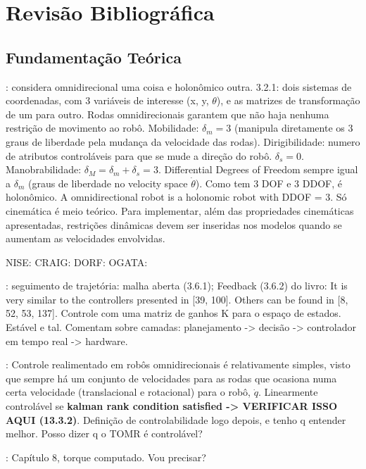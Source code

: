 \section{Revisão Bibliográfica}
\label{sec:revbib}

\subsection{Fundamentação Teórica}


\cite{siegwart2011introduction}: considera omnidirecional uma coisa e holonômico outra. 3.2.1: dois sistemas de coordenadas, com 3 variáveis de interesse (x, y, $\theta$), e as matrizes de transformação de um para outro. Rodas omnidirecionais garantem que não haja nenhuma restrição de movimento ao robô. Mobilidade: $\delta_m = 3$ (manipula diretamente os 3 graus de liberdade pela mudança da velocidade das rodas). Dirigibilidade: numero de atributos controláveis para que se mude a direção do robô. $\delta_s = 0$. Manobrabilidade: $\delta_M = \delta_m+\delta_s = 3$. Differential Degrees of Freedom sempre igual a $\delta_m$ (graus de liberdade no velocity space $\dot\theta$). Como tem 3 DOF e 3 DDOF, é holonômico. A omnidirectional robot is a holonomic robot with DDOF = 3. Só cinemática é meio teórico. Para implementar, além das propriedades cinemáticas apresentadas, restrições dinâmicas devem ser inseridas nos modelos quando se aumentam as velocidades envolvidas.

NISE:
CRAIG:
DORF:
OGATA:

\cite{siegwart2011introduction}: seguimento de trajetória: malha aberta (3.6.1); Feedback (3.6.2) do livro: It is very similar to the controllers presented in [39, 100]. Others can be found in [8, 52, 53, 137]. Controle com uma matriz de ganhos K para o espaço de estados. Estável e tal. Comentam sobre camadas: planejamento -> decisão -> controlador em tempo real -> hardware.

\cite{lynch2017modern}: Controle realimentado em robôs omnidirecionais é relativamente simples, visto que sempre há um conjunto de velocidades para as rodas que ocasiona numa certa velocidade (translacional e rotacional) para o robô, $\dot{q}$. Linearmente controlável se \textbf{kalman rank condition satisfied -> VERIFICAR ISSO AQUI (13.3.2)}. Definição de controlabilidade logo depois, e tenho q entender melhor. Posso dizer q o TOMR é controlável?

\cite{siciliano2016springer}: Capítulo 8, torque computado. Vou precisar?

